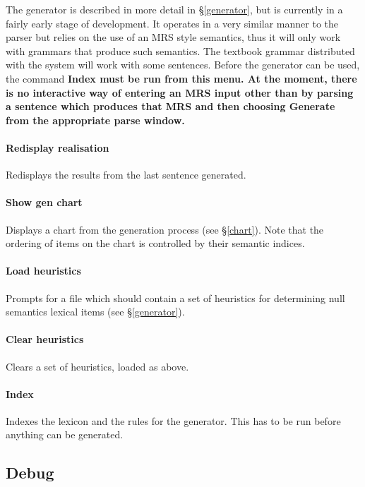 \documentclass[12pt]{report}
\newcommand{\lkbmenucommand}{\bf}
\begin{document}
The generator is described in more detail in \S\ref{generator},
but is currently in a fairly early stage of development.
It operates in a very similar manner to the parser
but relies on the use of an MRS style semantics,
thus it will only work with grammars that produce 
such semantics.  
The textbook grammar distributed with
the system will work with some sentences.
Before the generator can be used,
the command \lkbmenucommand{Index} must be run from this menu.
At the moment,
there is no interactive way of entering an MRS input other than by parsing
a sentence which produces that MRS and then choosing
\lkbmenucommand{Generate} from the appropriate parse window.

\paragraph{Redisplay realisation}
Redisplays the results from the last sentence generated.

\paragraph{Show gen chart}
Displays a chart from the generation process (see \S\ref{chart}).  Note that 
the ordering of items on the chart is controlled by their semantic
indices.  

\paragraph{Load heuristics}

Prompts for a file which should contain a set of heuristics for
determining null semantics lexical items (see \S\ref{generator}).

\paragraph{Clear heuristics}

Clears a set of heuristics, loaded as above.

\paragraph{Index}
Indexes the lexicon and the rules for the generator.  This has to
be run before anything can be generated.


\subsection{Debug}
\label{debug}
\end{document}

